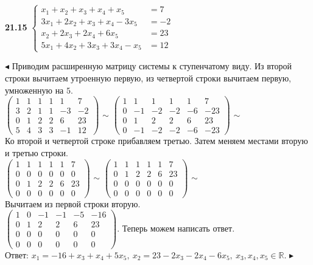 \documentclass[a5paper,10pt]{article}
\begin{document}
\medskip
\noindent
{\bf 21.15}
$\begin{cases}
x_1+x_2+x_3+x_4+x_5&=7\\
3x_1+2x_2+x_3+x_4-3x_5&=-2\\
x_2+2x_3+2x_4+6x_5&=23\\
5x_1+4x_2+3x_3+3x_4-x_5&=12
\end{cases}$

\medskip
\noindent
$\blacktriangleleft$ Приводим расширенную матрицу системы к ступенчатому виду. Из второй строки вычитаем утроенную первую, из четвертой строки вычитаем первую, умноженную на $5$.\\[3pt]
$\left(\begin{array}{rrrrr|r}
1& 1& 1& 1& 1& 7\\
3& 2& 1& 1& -3& -2\\
0& 1& 2& 2& 6& 23\\
5& 4& 3& 3& -1& 12
\end{array}\right)$
$\sim$
$\left(\begin{array}{rrrrr|r}
1& 1& 1& 1& 1& 7\\
0& -1& -2& -2& -6& -23\\
0& 1& 2& 2& 6& 23\\
0& -1& -2& -2& -6& -23
\end{array}\right)$
$\sim$\\[3pt]
Ко второй и четвертой строке прибавляем третью. Затем меняем местами вторую и третью строки.\\[3pt]
$\left(\begin{array}{rrrrr|r}
1& 1& 1& 1& 1& 7\\
0& 0& 0& 0& 0& 0\\
0& 1& 2& 2& 6& 23\\
0& 0& 0& 0& 0& 0
\end{array}\right)$
$\sim$
$\left(\begin{array}{rrrrr|r}
1& 1& 1& 1& 1& 7\\
0& 1& 2& 2& 6& 23\\
0& 0& 0& 0& 0& 0\\
0& 0& 0& 0& 0& 0
\end{array}\right)$
$\sim$\\[3pt]
Вычитаем из первой строки вторую.\\[3pt]
$\left(\begin{array}{rrrrr|r}
1& 0& -1& -1& -5& -16\\
0& 1& 2& 2& 6& 23\\
0& 0& 0& 0& 0& 0\\
0& 0& 0& 0& 0& 0
\end{array}\right)$. Теперь можем написать ответ.\\[3pt]
Ответ: $x_1=-16+x_3+x_4+5x_5,\ x_2=23-2x_3-2x_4-6x_5,\ x_3,x_4,x_5\in \mathbb R$.
$\blacktriangleright$
\end{document}
